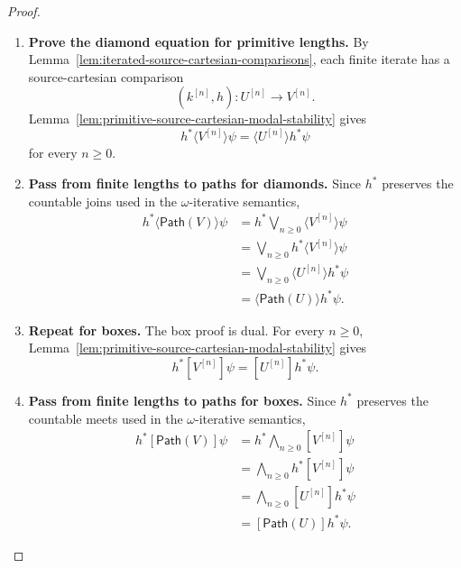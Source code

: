 \begin{proof}
\begin{enumerate}
  \item \textbf{Prove the diamond equation for primitive lengths.}
  By Lemma~\ref{lem:iterated-source-cartesian-comparisons}, each finite
  iterate has a source-cartesian comparison
  \[
    (k^{[n]},h):U^{[n]}\to V^{[n]}.
  \]
  Lemma~\ref{lem:primitive-source-cartesian-modal-stability} gives
  \[
    h^\ast\langle V^{[n]}\rangle\psi
    =
    \langle U^{[n]}\rangle h^\ast\psi
  \]
  for every \(n\geq 0\).

  \item \textbf{Pass from finite lengths to paths for diamonds.}
  Since \(h^\ast\) preserves the countable joins used in the
  \(\omega\)-iterative semantics,
  \[
  \begin{aligned}
    h^\ast\langle\mathsf{Path}(V)\rangle\psi
    &=
    h^\ast
    \bigvee_{n\geq 0}
    \langle V^{[n]}\rangle\psi
    \\
    &=
    \bigvee_{n\geq 0}
    h^\ast\langle V^{[n]}\rangle\psi
    \\
    &=
    \bigvee_{n\geq 0}
    \langle U^{[n]}\rangle h^\ast\psi
    \\
    &=
    \langle\mathsf{Path}(U)\rangle h^\ast\psi.
  \end{aligned}
  \]

  \item \textbf{Repeat for boxes.}
  The box proof is dual. For every \(n\geq 0\),
  Lemma~\ref{lem:primitive-source-cartesian-modal-stability} gives
  \[
    h^\ast[ V^{[n]}]\psi
    =
    [U^{[n]}]h^\ast\psi.
  \]

  \item \textbf{Pass from finite lengths to paths for boxes.}
  Since \(h^\ast\) preserves the countable meets used in the
  \(\omega\)-iterative semantics,
  \[
  \begin{aligned}
    h^\ast[\mathsf{Path}(V)]\psi
    &=
    h^\ast
    \bigwedge_{n\geq 0}
    [V^{[n]}]\psi
    \\
    &=
    \bigwedge_{n\geq 0}
    h^\ast[V^{[n]}]\psi
    \\
    &=
    \bigwedge_{n\geq 0}
    [U^{[n]}]h^\ast\psi
    \\
    &=
    [\mathsf{Path}(U)]h^\ast\psi.
  \end{aligned}
  \]
\end{enumerate}
\end{proof}

